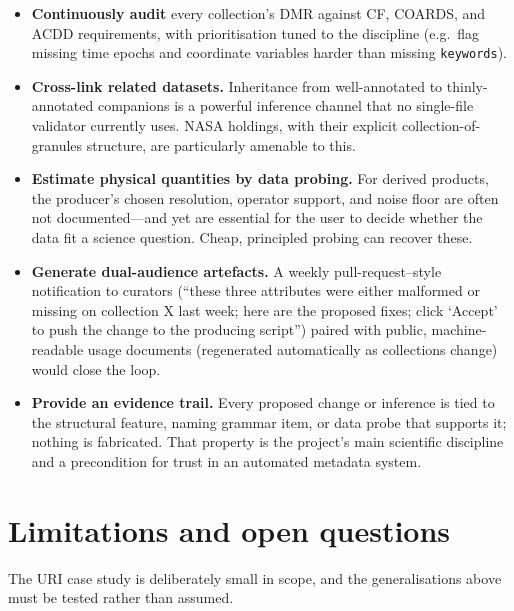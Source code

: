 \documentclass[11pt]{article}
\begin{document}
\begin{itemize}[topsep=2pt]
  \item \textbf{Continuously audit} every collection's DMR against
    CF, COARDS, and ACDD requirements, with prioritisation tuned
    to the discipline (e.g.\ flag missing time epochs and
    coordinate variables harder than missing \texttt{keywords}).
  \item \textbf{Cross-link related datasets.} Inheritance from
    well-annotated to thinly-annotated companions is a powerful
    inference channel that no single-file validator currently
    uses. NASA holdings, with their explicit collection-of-
    granules structure, are particularly amenable to this.
  \item \textbf{Estimate physical quantities by data probing.}
    For derived products, the producer's chosen resolution,
    operator support, and noise floor are often not
    documented---and yet are essential for the user to decide
    whether the data fit a science question. Cheap, principled
    probing can recover these.
  \item \textbf{Generate dual-audience artefacts.} A weekly
    pull-request--style notification to curators (``these three
    attributes were either malformed or missing on collection X
    last week; here are the proposed fixes; click `Accept' to
    push the change to the producing script'') paired with
    public, machine-readable usage documents (regenerated
    automatically as collections change) would close the loop.
  \item \textbf{Provide an evidence trail.} Every proposed change
    or inference is tied to the structural feature, naming
    grammar item, or data probe that supports it; nothing is
    fabricated. That property is the project's main scientific
    discipline and a precondition for trust in an automated
    metadata system.
\end{itemize}

\section{Limitations and open questions}\label{sec:limits}

The URI case study is deliberately small in scope, and the
generalisations above must be tested rather than assumed.
\end{document}
